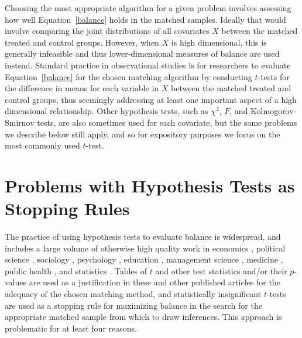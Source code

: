 \documentclass[11pt,titlepage]{article}
\begin{document}
Choosing the most appropriate algorithm for a given problem involves
assessing how well Equation~\ref{balance} holds in the matched
samples.  Ideally that would involve comparing the joint distributions
of all covariates $X$ between the matched treated and control groups.
However, when $X$ is high dimensional, this is generally infeasible
and thus lower-dimensional measures of balance are used instead.
Standard practice in observational studies is for researchers to
evaluate Equation~\ref{balance} for the chosen matching algorithm by
conducting $t$-tests for the difference in means for each variable in
$X$ between the matched treated and control groups, thus seemingly
addressing at least one important aspect of a high dimensional
relationship.  Other hypothesis tests, such as $\chi^2$, $F$, and
Kolmogorov-Smirnov tests, are also sometimes used for each covariate,
but the same problems we describe below still apply, and so for
expository purposes we focus on the most commonly used $t$-test.

\section{Problems with Hypothesis Tests as Stopping Rules}

The practice of using hypothesis tests to evaluate balance is
widespread, and includes a large volume of otherwise high quality work
in economics \citep{LisMilFre03,BlaSmi04,AgoDyn04,DehWah99,
  DehWah02,SmiTod05}, political science \citep{Imai05,SimHop05},
sociology \citep{LunSmi05}, psychology
\citep{HavNag05,HilWalBro05,YosMagBos03,JonDAgGon04,McCRidMor04},
education \citep{Crosnoe05,SchBuc03}, management science
\citep{FreMil04, Villalonga04,WanSchAvo05}, medicine
\citep{WanSchAvo05, MacRivJur06,LinPekWan05,ManTudDie06, PetRoeMul06,
  ShiLitPot06,SabCanGib05,PerTuUnd00,AusMam06,AusMamStu05}, public
health \citep{NovReaRau06,ElBGilWu05,LauSmiSta00,BinBreEar05}, and
statistics \citep{LuZanHor01}.  Tables of $t$ and other test
statistics and/or their $p$-values are used as a justification in
these and other published articles for the adequacy of the chosen
matching method, and statistically insignificant $t$-tests are used as
a stopping rule for maximizing balance in the search for the
appropriate matched sample from which to draw inferences.  This
approach is problematic for at least four reasons.
\end{document}
